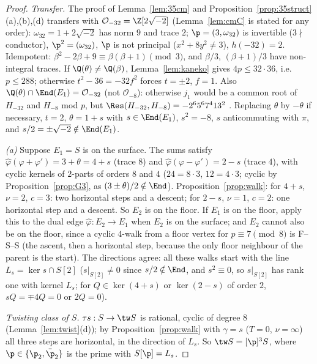 \begin{proof}
\emph{Transfer.}  The proof of Lemma~\ref{lem:35cm} and Proposition~\ref{prop:35struct}(a),(b),(d) transfers with $\mathcal O_{-32}=\Z[2\sqrt{-2}]$
(Lemma~\ref{lem:cmC} is stated for any order): $\omega_{32}=1+2\sqrt{-2}$ has norm $9$ and trace $2$; $\p=(3,\omega_{32})$ is invertible
($3\nmid$ conductor), $\p^2=(\omega_{32})$, $\p$ is not principal ($x^2+8y^2\ne3$), $h(-32)=2$.  Idempotent: $\beta^2-2\beta+9\equiv\beta(\beta+1)
\pmod 3$, and $\beta/3$, $(\beta+1)/3$ have non-integral traces.  If $\Q(\theta)\ne\Q(\beta)$, Lemma~\ref{lem:kaneko} gives $4p\le32\cdot36$, i.e.\
$p\le288$; otherwise $t^2-36=-32f^2$ forces $t=\pm2$, $f=1$.  Also $\Q(\theta)\cap\End(E_1)=\mathcal O_{-32}$ (not $\mathcal O_{-8}$): otherwise
$j_1$ would be a common root of $H_{-32}$ and $H_{-8}$ mod $p$, but $\Res(H_{-32},H_{-8})=-2^65^67^413^2$ \tagX.  Replacing $\theta$ by $-\theta$ if
necessary, $t=2$, $\theta=1+s$ with $s\in\End(E_1)$, $s^2=-8$, $s$ anticommuting with $\pi$, and $s/2=\pm\sqrt{-2}\notin\End(E_1)$.

\emph{(a)}  Suppose $E_1=S$ is on the surface.  The sums satisfy $\widehat\varphi(\varphi+\varphi')=3+\theta=4+s$ (trace $8$) and
$\widehat\varphi(\varphi-\varphi')=2-s$ (trace $4$), with cyclic kernels of $2$-parts of orders $8$ and $4$ ($24=8\cdot3$, $12=4\cdot3$; cyclic by
Proposition~\ref{prop:G3}, as $(3\pm\theta)/2\notin\End$).  Proposition~\ref{prop:walk}: for $4+s$, $\nu=2$, $c=3$: two horizontal steps and a descent;
for $2-s$, $\nu=1$, $c=2$: one horizontal step and a descent.  So $E_2$ is on the floor.  If $E_1$ is on the floor, apply this to the
dual edge $\widehat\varphi:E_2\to E_1$ when $E_2$ is on the surface; and $E_2$ cannot also be on the floor, since a cyclic $4$-walk from a
floor vertex for $p\equiv7\pmod8$ is F--S--S (the ascent, then a horizontal step, because the only floor neighbour of the parent is the
start).  The directions agree: all these walks start with the line $L_s=\ker s\cap S[2]$ ($s|_{S[2]}\ne0$ since $s/2\notin\End$, and
$s^2\equiv0$, so $s|_{S[2]}$ has rank one with kernel $L_s$; for $Q\in\ker(4+s)$ or $\ker(2-s)$ of order $2$, $sQ=\mp4Q=0$ or $2Q=0$).

\emph{Twisting class of $S$.}  $\tau s:S\to\tw S$ is rational, cyclic of degree $8$ (Lemma~\ref{lem:twist}(d)); by Proposition~\ref{prop:walk}
with $\gamma=s$ ($T=0$, $\nu=\infty$) all three steps are horizontal, in the direction of $L_s$.  So $\tw S=[\p]^3S$, where
$\p\in\{\p_2,\bar\p_2\}$ is the prime with $S[\p]=L_s$.


\end{proof}
